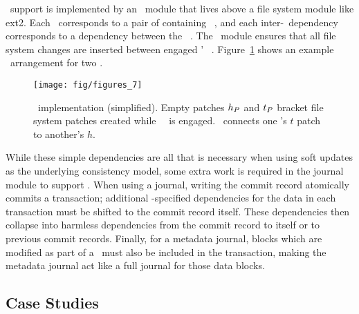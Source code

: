 
\Patchgroup\ support is implemented by an \LFS\ module that lives above a file
system module like ext2.
%
Each \patchgroup\ corresponds to a pair of containing \noop\ \patches,
and each inter-\patchgroup\ dependency corresponds to a dependency between
the \noop\ \patches.
%
The \LFS\ module ensures that all file system changes are inserted
between engaged \patchgroups' \noop\ \patches.
%
Figure~\ref{fig:patchgroup-patches} shows an example \patch\ arrangement for
two \patchgroups.

\begin{figure}[t]
\centering
\texttt{[image: fig/figures\_7]}
\caption{\Patchgroup\ implementation (simplified).  Empty
patches $h_{P}$ and $t_{P}$ bracket file system patches created while
\patchgroup\ \pgPg\ is engaged.  \pgDepend\ connects one
\patchgroup's $t$ patch to another's $h$.}
\label{fig:patchgroup-patches} 
\end{figure}

While these simple dependencies are all that is necessary when using soft
updates as the underlying consistency model, some extra work is required in the
journal module to support \patchgroups.
%
When using a journal, writing the commit record atomically commits a
transaction; additional \patchgroup-specified dependencies for the data in each
transaction must be shifted to the commit record itself.
%
These dependencies then collapse into harmless dependencies from the commit
record to itself or to previous commit records.
%
Finally, for a metadata journal, blocks which are modified as part of a
\patchgroup\ must also be included in the transaction, making the metadata
journal act like a full journal for those data blocks.

\subsection{Case Studies}
\label{sec:patchgroup:casestudies}


